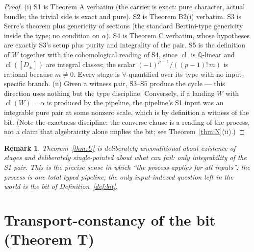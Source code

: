 \documentclass[11pt]{article}
\newtheorem{remark}[theorem]{Remark}
\newcommand{\cl}{\operatorname{cl}}
\newcommand{\Q}{\mathbb{Q}}
\begin{document}
\begin{proof}
(i) S1 is Theorem A verbatim (the carrier is exact: pure character, actual
bundle; the trivial side is exact and pure).  S2 is Theorem B2(i) verbatim.
S3 is Serre's theorem plus genericity of sections (the standard Bertini-type
genericity inside the type; no condition on $\alpha$).  S4 is Theorem C
verbatim, whose hypotheses are exactly S3's setup plus purity and integrality
of the pair.  S5 is the definition of $W$ together with the cohomological
reading of S4, since $\cl$ is $\Q$-linear and
$\cl([D_\pm])$ are integral classes; the scalar
$(-1)^{p-1}/((p-1)!\,m)$ is rational because $m\ne0$.  Every stage is
$\forall$-quantified over its type with no input-specific branch.
(ii) Given a witness pair, S3--S5 produce the cycle --- this direction uses
nothing but the type discipline.  Conversely, if a landing $W$ with
$\cl(W)=\alpha$ is produced by the pipeline, the pipeline's S1 input was an
integrable pure pair at some nonzero scale, which is by definition a witness
of the bit.  (Note the exactness discipline: the converse clause is a reading of the
process, not a claim that algebraicity alone implies the bit; see
Theorem~\ref{thm:N}(ii).)
\end{proof}

\begin{remark}
Theorem~\ref{thm:U} is deliberately unconditional about existence of stages
and deliberately single-pointed about what can fail: only integrability of
the S1 pair.  This is the precise sense in which ``the process applies for
all inputs'': the process is one total typed pipeline; the only
input-indexed question left in the world is the bit of
Definition~\ref{def:bit}.
\end{remark}

\section{Transport-constancy of the bit (Theorem T)}
\label{sec:transport}
\end{document}
